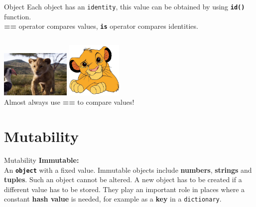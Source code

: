     \begin{frame}{Object}
        \Large
        Each object has an \texttt{identity},
        \pause
         this value can be obtained by using \texttt{\textbf{id()}} function.\\
        \pause
        \textbf{==} operator compares values, \textbf{\texttt{is}} operator compares identities. 
        \pause
        \inputminted[frame=single,framesep=2pt, firstline=6]{python3}{code-examples/identity.py}
        \pause
        \includegraphics[width=0.25\textwidth]{images/simba_2019.jpg}
        \includegraphics[width=0.2\textwidth]{images/simba_cartoon.jpg}\\
        Almost always use \textbf{==} to compare values!
    \end{frame}

    \section{Mutability}
    \begin{frame}{Mutability}
        \huge
        \textbf{Immutable:}\\
        \LARGE
        An \texttt{\textbf{object}} with a fixed value.
        \pause
         Immutable objects include \textbf{numbers}, \textbf{strings} and \textbf{tuples}. Such an object cannot be altered.
        \pause
         A new object has to be created if a different value has to be stored.
        \pause
         They play an important role in places where a constant \textbf{hash value} is needed, for example as a \textbf{key} in a \texttt{dictionary}.
        \pause
        \Large
        \begin{columns}
            \begin{column}{0.2\textwidth}
                \inputminted[frame=single,framesep=2pt]{python3}{code-examples/value_update.py}
            \end{column}
            \begin{column}{0.75\textwidth}
                \inputminted[frame=single,framesep=2pt]{python3}{code-examples/change_string.py}
            \end{column}
        \end{columns}
    \end{frame}

